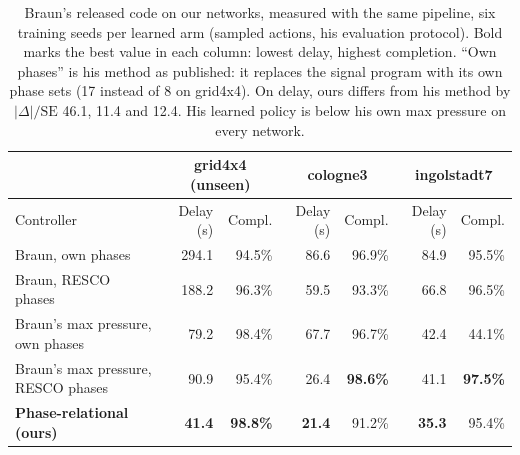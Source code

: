 \documentclass[10pt,twocolumn,a4paper]{article}
\begin{document}
\begin{table}[t]
\centering\footnotesize
\setlength{\tabcolsep}{6pt}
\begin{tabular}{|l|r|r|r|r|r|r|}
\hline
 & \multicolumn{2}{c|}{grid4x4 (unseen)} & \multicolumn{2}{c|}{cologne3} & \multicolumn{2}{c|}{ingolstadt7} \\ \hline
Controller & Delay (s) & Compl. & Delay (s) & Compl. & Delay (s) & Compl. \\ \hline
Braun, own phases & 294.1 & 94.5\% & 86.6 & 96.9\% & 84.9 & 95.5\% \\ \hline
Braun, RESCO phases & 188.2 & 96.3\% & 59.5 & 93.3\% & 66.8 & 96.5\% \\ \hline
Braun's max pressure, own phases & 79.2 & 98.4\% & 67.7 & 96.7\% & 42.4 & 44.1\% \\ \hline
Braun's max pressure, RESCO phases & 90.9 & 95.4\% & 26.4 & \textbf{98.6\%} & 41.1 & \textbf{97.5\%} \\ \hline
\textbf{Phase-relational (ours)} & \textbf{41.4} & \textbf{98.8\%} & \textbf{21.4} & 91.2\% & \textbf{35.3} & 95.4\% \\ \hline
\end{tabular}
\caption{Braun's released code on our networks, measured with the same pipeline, six
training seeds per learned arm (sampled actions, his evaluation protocol). Bold marks the
best value in each column: lowest delay, highest completion. ``Own phases'' is his method as
published: it replaces the signal program with its own phase sets (17 instead of 8 on
grid4x4). On delay, ours differs from his method by $|\Delta|/\mathrm{SE}$ 46.1, 11.4 and
12.4. His learned policy is below his own max pressure on every network.}
\label{tab:braun}
\end{table}
\end{document}
